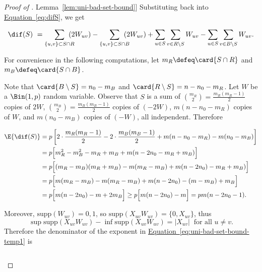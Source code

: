 \documentclass[11pt]{article}
\numberwithin{equation}{section}
\theoremstyle{definition}
\theoremstyle{plain}
\newcommand{\expref}[2]{\hyperref[#2]{#1~\ref{#2}}}
\newcommand{\expeqref}[2]{\hyperref[#2]{#1~\eqref{#2}}}
\begin{document}
\begin{proof}[Proof of \expref{Lemma}{lem:uni-bad-set-bound}]
				\noindent Substituting back into \expeqref{Equation}{eq:difS}, we get
				\begin{linenomath}\begin{equation*}
						\dif(S) \ = \sum_{\{u, v\} \subset S\cap R}\hspace{-1em}\left(2W_{uv}\right)
						- \sum_{\{u, v\} \subset S\cap B}\hspace{-1em}\left(2 W_{uv}\right)
						+ \sum_{u\in S} \sum_{v\in R\setminus S}W_{uv} - \sum_{u\in S} \sum_{v\in B\setminus S}W_{uv} .
				\end{equation*}\end{linenomath}
				For convenience in the following computations, let $m_R\defeq \card{S\cap R}$ and $m_B \defeq \card{S\cap B}$.
				
				\noindent Note that $\card{B\setminus S} = n_0 - m_B$ and $\card{R\setminus S} = n - n_0 - m_R$.
				Let $W$ be a $\Bin(1, p)$ random variable.
				Observe that $S$ is a sum of
				$\binom{m_R}{2} = \frac{m_R(m_R - 1)}{2}$ copies of $2W$,
				$\binom{m_B}{2} = \frac{m_B(m_B - 1)}{2}$ copies of $(-2W)$,
				$m(n - n_0 - m_R)$ copies of $W$,
				and $m(n_0 - m_B)$ copies of $(-W)$, all independent.
				Therefore
				\begin{linenomath}\begin{equation*}  \label{eq:temp97}
						\begin{aligned}
							\E{\dif(S)}
							& = p\left[2\cdot\frac{m_R(m_R - 1)}{2} - 2\cdot\frac{m_B(m_B - 1)}{2} + m(n - n_0 - m_R) - m(n_0 - m_B) \right] \\
							& = p\Bigl[m_R^2 - m_B^2 - m_R + m_B + m(n - 2n_0 - m_R + m_B)\Bigr] \\
							& = p\Bigl[(m_R - m_B)(m_R + m_B) - m(m_R - m_B) + m(n - 2n_0) - m_R + m_B)\Bigr] \\
							& = p\Bigl[m(m_R - m_B) - m(m_R - m_B) + m(n - 2n_0) - (m - m_B) + m_B\Bigr] \\
							& = p\Bigl[m(n - 2n_0) - m + 2m_B\Bigr] \ge p\Bigl[m(n - 2n_0) - m\Bigr] = pm(n - 2n_0 - 1).
						\end{aligned}
				\end{equation*}\end{linenomath}
				Moreover, $\text{supp}(W_{uv}) = {0, 1}$, so $\text{supp}(X_{uv}W_{uv}) = \{0, X_{uv}\}$, thus
				\[
				\sup \text{supp}(X_{uv}W_{uv}) - \inf \text{supp}(X_{uv}W_{uv}) = |X_{uv}| \ \text{ for all } u\neq v.
				\]
				Therefore the denominator of the exponent in \expeqref{Equation}{eq:uni-bad-set-bound-temp1} is
				\begin{linenomath}\begin{equation*}

\end{equation*}
\end{linenomath}
\end{proof}
\end{document}
